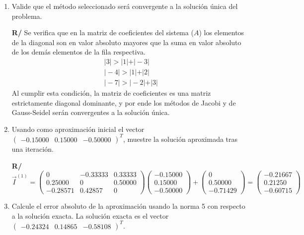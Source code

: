 \documentclass[12pt]{article}
\begin{document}
\begin{enumerate}[leftmargin=*,widest=9]
{\begin{enumerate}[label=\alph*]
\[   \]
   \[
\vec{c}_J = \begin{pmatrix} 3 & 0 & 0\\ 0 & -4 & 0\\ 0 & 0 & -7 \end{pmatrix}^{-1}\begin{pmatrix} 0 \\ -2 \\ 5 \end{pmatrix} =
\begin{pmatrix} 0\\ 0.50000 \\ -0.71429 \end{pmatrix}
   \]
   \item Valide que el método seleccionado será convergente a la solución única del problema.

\textbf{R/} Se verifica que en la matriz de coeficientes del sistema (\(A\)) los elementos de la diagonal son en valor absoluto mayores que la suma en valor absoluto de los demás elementos de la fila respectiva.
   \begin{eqnarray*}
   \vert 3 \vert > \vert 1 \vert + \vert -3 \vert \\
   \vert -4 \vert > \vert 1 \vert + \vert 2 \vert \\
   \vert -7 \vert > \vert -2 \vert + \vert 3 \vert
   \end{eqnarray*}
   Al cumplir esta condición, la matriz de coeficientes es una matriz estrictamente diagonal dominante, y por ende los métodos de Jacobi y de Gauss-Seidel serán convergentes a la solución única.
   \item Usando como aproximación inicial el vector \( \begin{pmatrix} -0.15000 & 0.15000 & -0.50000 \end{pmatrix}^T \), muestre la solución aproximada tras una iteración.

\textbf{R/}
   \[
\vec{I}^{(1)} = \begin{pmatrix}0 & -0.33333 & 0.33333\\ 0.25000 & 0 & 0.50000\\ -0.28571 & 0.42857 & 0 \end{pmatrix}\begin{pmatrix} -0.15000\\ 0.15000\\ -0.50000 \end{pmatrix} + \begin{pmatrix} 0\\ 0.50000 \\ -0.71429 \end{pmatrix} = \begin{pmatrix}-0.21667\\0.21250\\-0.60715\end{pmatrix}
   \]
   \item Calcule el error absoluto de la aproximación usando la norma 5 con respecto a la solución exacta. La solución exacta es el vector
   \( \begin{pmatrix} -0.24324 & 0.14865 & -0.58108 \end{pmatrix}^T \).


\end{enumerate}}
\end{enumerate}
\end{document}
